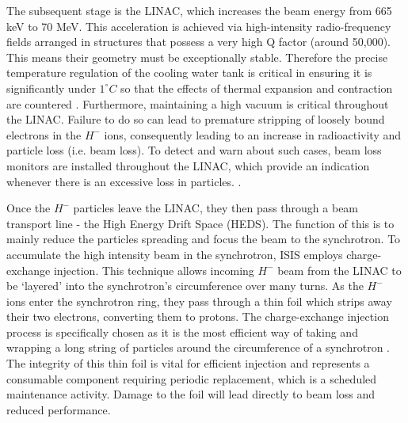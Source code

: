 \documentclass[10pt,oneside]{report}
\begin{document}
The subsequent stage is the LINAC, which increases the beam energy from 665 keV to 70 MeV. This acceleration is achieved via high-intensity radio-frequency fields arranged in structures that possess a very high Q factor \cite{michael2006electronic} (around 50,000). This means their geometry must be exceptionally stable. Therefore the precise temperature regulation of the cooling water tank is critical in ensuring it is significantly under $1^\circ C$ so that the effects of thermal expansion and contraction are countered \cite{2021practicalguide}. Furthermore, maintaining a high vacuum is critical throughout the LINAC. Failure to do so can lead to premature stripping of loosely bound electrons in the $H^-$ ions, consequently leading to an increase in radioactivity and particle loss (i.e. beam loss). To detect and warn about such cases, beam loss monitors are installed throughout the LINAC, which provide an indication whenever there is an excessive loss in particles. \cite{2021practicalguide}.

Once the $H^-$ particles leave the LINAC, they then pass through a beam transport line - the High Energy Drift Space (HEDS). The function of this is to mainly reduce the particles spreading and focus the beam to the synchrotron. To accumulate the high intensity beam in the synchrotron, ISIS employs charge-exchange injection. This technique allows incoming $H^-$ beam from the LINAC to be `layered' into the synchrotron's circumference over many turns. As the $H^-$ ions enter the synchrotron ring, they pass through a thin foil which strips away their two electrons, converting them to protons. The charge-exchange injection process is specifically chosen as it is the most efficient way of taking and wrapping a long string of particles around the circumference of a synchrotron \cite{2021practicalguide, ankenbrandt1980h}. The integrity of this thin foil is vital for efficient injection and represents a consumable component requiring periodic replacement, which is a scheduled maintenance activity. Damage to the foil will lead directly to beam loss and reduced performance.
\end{document}
